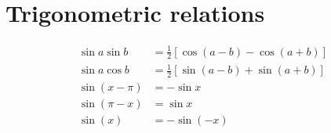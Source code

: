 \documentclass{article}
\begin{document}
% 


\appendix

\section*{Trigonometric relations}

\begin{align}
  \sin a \sin b &= \frac{1}{2}\left[ 
  \cos(a-b) - \cos(a+b)
\right]\label{eq:sinasinb} \\
  \sin a \cos b &= \frac{1}{2}\left[ 
  \sin(a-b) + \sin(a+b)
\right]\label{eq:sinacosb} \\
\sin(x-\pi) &= -\sin x \label{eq:sinx-pi} \\
\sin(\pi-x) &= \sin x \label{eq:sinpi-x} \\
\sin(x) &= - \sin(-x) \label{eq:sinimpar}
\end{align}
\end{document}
